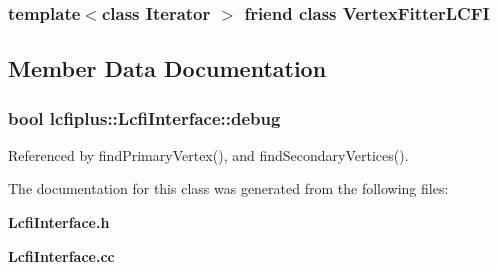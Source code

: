 \subsubsection[{Vertex\-Fitter\-L\-C\-F\-I}]{\setlength{\rightskip}{0pt plus 5cm}template$<$class Iterator $>$ friend class {\bf Vertex\-Fitter\-L\-C\-F\-I}\hspace{0.3cm}{\ttfamily [friend]}}\label{classlcfiplus_1_1LcfiInterface_a996b32b4a9ba9ca9c1ff7035f5e123df}


\subsection{Member Data Documentation}
\subsubsection[{debug}]{\setlength{\rightskip}{0pt plus 5cm}bool lcfiplus\-::\-Lcfi\-Interface\-::debug}\label{classlcfiplus_1_1LcfiInterface_a8fea94d95b2e7aadcc1d2a203cb2a2b0}


Referenced by find\-Primary\-Vertex(), and find\-Secondary\-Vertices().



The documentation for this class was generated from the following files\-:\begin{DoxyCompactItemize}
\item 
{\bf Lcfi\-Interface.\-h}\item 
{\bf Lcfi\-Interface.\-cc}\end{DoxyCompactItemize}
